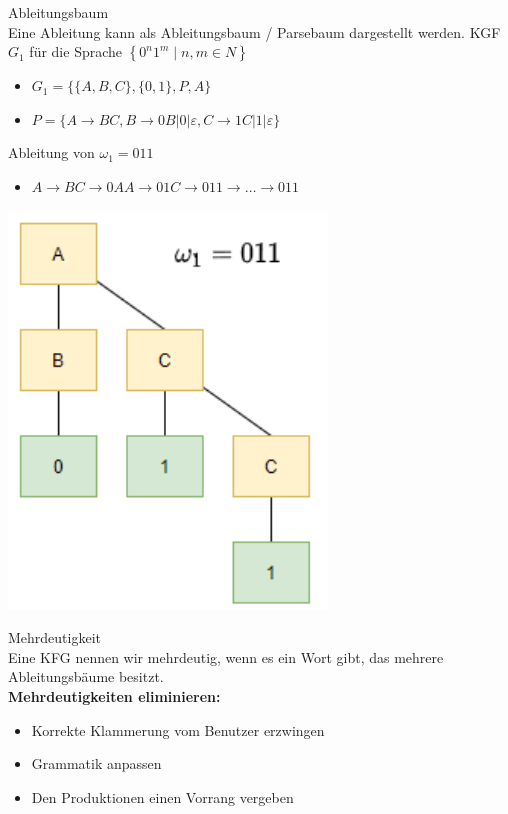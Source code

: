 \begin{definition}{Ableitungsbaum}\\
    Eine Ableitung kann als Ableitungsbaum / Parsebaum dargestellt werden. KGF $G_{1}$ für die Sprache $\left\{0^{n} 1^{m} \mid n, m \in N\right\}$

    \begin{itemize}
    \item $G_{1}=\{\{A, B, C\},\{0,1\}, P, A\}$
    \item $P=\{A \rightarrow B C, B \rightarrow 0 B|0| \varepsilon, C \rightarrow 1 C|1| \varepsilon\}$
    \end{itemize}

    Ableitung von $\omega_{1}=011$

    \begin{itemize}
    \item $A \rightarrow B C \rightarrow 0 A A \rightarrow 01 C \rightarrow 011 \rightarrow \ldots \rightarrow 011$
    \end{itemize}
    \includegraphics[width=0.3\linewidth]{ableitungsbaum.png}
\end{definition}

\begin{concept}{Mehrdeutigkeit}\\
    Eine KFG nennen wir mehrdeutig, wenn es ein Wort gibt, das mehrere Ableitungsbäume besitzt.\\
    \textbf{Mehrdeutigkeiten eliminieren:}
    \begin{itemize}
    \item Korrekte Klammerung vom Benutzer erzwingen
    \item Grammatik anpassen
    \item Den Produktionen einen Vorrang vergeben
    \end{itemize}
\end{concept}

